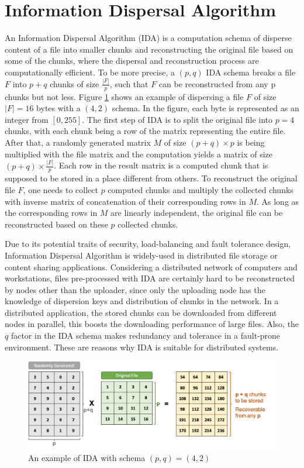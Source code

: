 \section{Information Dispersal Algorithm}
\label{s:informationdispersalalgorithm}

An Information Dispersal Algorithm (IDA)\cite{rabin1989efficient} is a computation schema of disperse content of a file into smaller chunks and reconstructing the original file based on some of the chunks, where the dispersal and reconstruction process are computationally efficient. To be more precise, a $(p,q)$ IDA schema breaks a file $F$ into $p + q$ chunks of size $\frac{|F|}{p}$, such that $F$ can be reconstructed from any p chunks but not less. Figure \ref{fig:ida} shows an example of dispersing a file $F$ of size $|F|=16$ bytes with a $(4,2)$ schema. In the figure, each byte is represented as an integer from $[0, 255]$. The first step of IDA is to split the original file into $p=4$ chunks, with each chunk being a row of the matrix representing the entire file. After that, a randomly generated matrix $M$ of size $(p+q)\times p$ is being multiplied with the file matrix and the computation yields a matrix of size $(p+q)\times \frac{|F|}{p}$. Each row in the result matrix is a computed chunk that is supposed to be stored in a place different from others. To reconstruct the original file $F$, one needs to collect $p$ computed chunks and multiply the collected chunks with inverse matrix of concatenation of their corresponding rows in $M$. As long as the corresponding rows in $M$ are linearly independent, the original file can be reconstructed based on these $p$ collected chunks.

Due to its potential traits of security, load-balancing and fault tolerance design, Information Dispersal Algorithm is widely-used in distributed file storage or content sharing applications. Considering a distributed network of computers and workstations, files pre-processed with IDA are certainly hard to be reconstructed by nodes other than the uploader, since only the uploading node has the knowledge of dispersion keys and distribution of chunks in the network. In a distributed application, the stored chunks can be downloaded from different nodes in parallel, this boosts the downloading performance of large files.  Also, the $q$ factor in the IDA schema makes redundancy and tolerance in a fault-prone environment. These are reasons why IDA is suitable for distributed systems.

\begin{figure}[hbt]
\centering
  \includegraphics[width=13cm]{figures/ida.png}
  \caption{An example of IDA with schema $(p,q)=(4,2)$}
  \label{fig:ida}
\end{figure}

